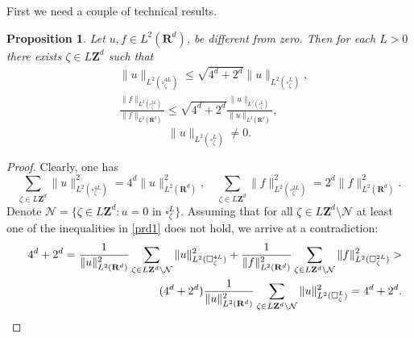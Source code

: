 \documentclass[11pt]{article}
\def\RR{\R}
\newcommand{\R}{\mathbf{R}}
\newtheorem{proposition}[theorem]{Proposition}
\theoremstyle{remark}
\begin{document}
First we need a couple of technical results.
\begin{proposition} \label{cetprop1}
Let $u,f \in L^2(\mathbf{R}^d)$,  be different from zero. 	Then for each $L>0$ there exists $\zeta \in L \mathbf{Z}^d$ such that
	\begin{equation}
		\begin{aligned}
			&{\|u\|_{L^2(\square^{4L}_\zeta)}} \leq  \sqrt{4^d+  2^d}   {\| u\|_{L^2(\square^{L}_\zeta)}},
			\\
		&	\frac{\|  f\|_{L^2(\square^{2L}_\zeta)}}{\|f\|_{L^2(\RR^d)}}\leq \sqrt{4^d+  2^d}  \frac{\| u \|_{L^2(\square^L_\zeta)}}{\|u\|_{L^2(\RR^d)}},  \label{prd1} 	
		\end{aligned}
		 \end{equation}
		 \begin{equation*}
		 	\|  u \|_{L^2(\square^L_\zeta)} \neq 0.
		 \end{equation*}
		
	
\end{proposition} 	
\begin{proof}
	Clearly, one has
	\begin{equation*} %
	\sum_{\zeta\in L\mathbf{Z}^d} \|u\|_{L^2(\square^{4L}_\zeta)}^2=4^d\|u\|^2_{L^2(\RR^d)}, \quad		
		\sum_{\zeta \in L\mathbf{Z}^d} \| f\|_{L^2(\square^{2L}_\zeta)}^2=2^d\|f\|^2_{L^2(\RR^d)}.
	\end{equation*} 	
Denote	$\mathcal{N}=\{\zeta\in L\mathbf{Z}^d:   u=0 \mbox{ in } \square^{L}_\zeta\}$.
	Assuming  that for all $\zeta\in L\mathbf{Z}^d \setminus \mathcal{N}$ at least one of the inequalities in \eqref{prd1} does not hold, we arrive at a contradiction:
	\begin{eqnarray*}
		& & 4^d+  2^d =	\frac{1}{\|u\|^2_{L^2(\RR^d)}}\sum_{\zeta\in L\mathbf{Z}^d \setminus \mathcal{N} } \| u\|_{L^2(\square^{4L}_\zeta)}^2+  \frac{1}{\|f\|^2_{L^2(\RR^d)}}	\sum_{\zeta\in L\mathbf{Z}^d \setminus \mathcal{N}} \|  f\|^2_{L^2(\square^{2L}_\zeta)}>\\ & &  \hspace{+10ex}  (4^d+  2^d )	\frac{1}{\|u\|^2_{L^2(\RR^d)}}	\sum_{\zeta\in L\mathbf{Z}^d \setminus \mathcal{N} } \|  u\|^2_{L^2(\square^{L}_\zeta)} =4^d+  2^d.
	\end{eqnarray*} 	
\end{proof} 	
\end{document}
